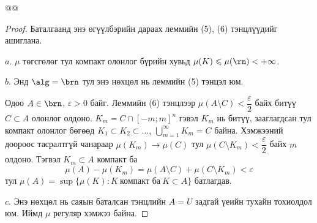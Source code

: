 @@
\begin{proof}
Баталгаанд энэ өгүүлбэрийн дараах леммийн (5), (6) тэнцлүүдийг ашиглана.

$a.$ $\mu$ төгсгөлөг тул компакт олонлог бүрийн хувьд $\mu(K)\leqslant\mu(\rn)<+\infty$.

$b.$ Энд $\alg=\brn$ тул энэ нөхцөл нь леммийн (5) тэнцэл юм.

Одоо $A\in\brn$, $\varepsilon>0$ байг. Леммийн (6) тэнцлээр $\mu(A\setminus C)<\dfrac{\varepsilon}{2}$ байх битүү $C\subset A$ олонлог олдоно. $K_m=C\cap[-m;m]^n$ гэвэл $K_m$ нь битүү, зааглагдсан тул компакт олонлог бөгөөд $K_1\subset K_2\subset\ldots$, $\bigcup\limits_{m=1}^{\infty}K_m=C$ байна. Хэмжээний доороос тасралтгүй чанараар $\mu(K_m)\to\mu(C)$ тул $\mu(C\setminus K_m)<\dfrac{\varepsilon}{2}$ байх $m$ олдоно. Тэгвэл $K_m\subset A$ компакт ба
$$\mu(A)-\mu(K_m)=\mu(A\setminus C)+\mu(C\setminus K_m)<\varepsilon$$
тул $\mu(A)=\sup\{\mu(K): K \ \mbox{компакт ба} \ K\subset A\}$ батлагдав.

$c.$ Энэ нөхцөл нь саяын баталсан тэнцлийн $A=U$ задгай үеийн тухайн тохиолдол юм. Иймд $\mu$ регуляр хэмжээ байна.
\end{proof}
